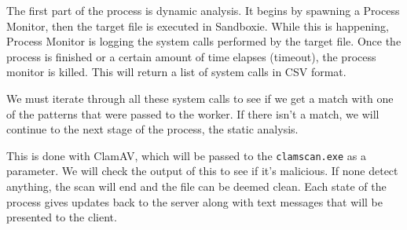 The first part of the process is dynamic analysis.
It begins by spawning a Process Monitor,
then the target file is executed in Sandboxie.
While this is happening,
Process Monitor is logging the system calls performed by the target file.
Once the process is finished or a certain amount of time elapses (timeout),
the process monitor is killed. This will return a list of system calls in CSV format.

We must iterate through all these system calls to see if we
get a match with one of the patterns that were passed to the worker.
If there isn't a match, we will continue to the next stage of the process,
the static analysis.

This is done with ClamAV, which will be passed to the
\texttt{clamscan.exe} as a parameter.
We will check the output of this to see if it's malicious. If none detect anything,
the scan will end and the file can be deemed clean.
Each state of the process gives updates back to the server along with
text messages that will be presented to the client.
